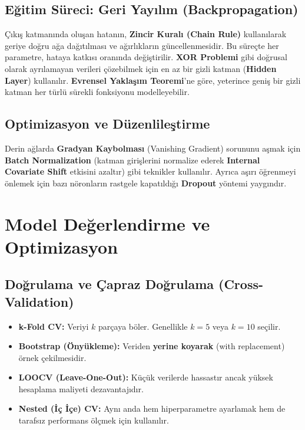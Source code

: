 \documentclass[12pt,a4paper]{article}
\begin{document}
\subsection{Eğitim Süreci: Geri Yayılım (Backpropagation)}
Çıkış katmanında oluşan hatanın, \textbf{Zincir Kuralı (Chain Rule)} kullanılarak geriye doğru ağa dağıtılması ve ağırlıkların güncellenmesidir. Bu süreçte her parametre, hataya katkısı oranında değiştirilir. \textbf{XOR Problemi} gibi doğrusal olarak ayrılamayan verileri çözebilmek için en az bir gizli katman (\textbf{Hidden Layer}) kullanılır. \textbf{Evrensel Yaklaşım Teoremi}'ne göre, yeterince geniş bir gizli katman her türlü sürekli fonksiyonu modelleyebilir.

\subsection{Optimizasyon ve Düzenlileştirme}
Derin ağlarda \textbf{Gradyan Kaybolması} (Vanishing Gradient) sorununu aşmak için \textbf{Batch Normalization} (katman girişlerini normalize ederek \textbf{Internal Covariate Shift} etkisini azaltır) gibi teknikler kullanılır. Ayrıca aşırı öğrenmeyi önlemek için bazı nöronların rastgele kapatıldığı \textbf{Dropout} yöntemi yaygındır.

\newpage
\section{Model Değerlendirme ve Optimizasyon}

\subsection{Doğrulama ve Çapraz Doğrulama (Cross-Validation)}
\begin{itemize}
    \item \textbf{k-Fold CV:} Veriyi $k$ parçaya böler. Genellikle $k=5$ veya $k=10$ seçilir.
    \item \textbf{Bootstrap (Önyükleme):} Veriden \textbf{yerine koyarak} (with replacement) örnek çekilmesidir.
    \item \textbf{LOOCV (Leave-One-Out):} Küçük verilerde hassastır ancak yüksek hesaplama maliyeti dezavantajıdır.
    \item \textbf{Nested (İç İçe) CV:} Aynı anda hem hiperparametre ayarlamak hem de tarafsız performans ölçmek için kullanılır.
\end{itemize}
\end{document}

